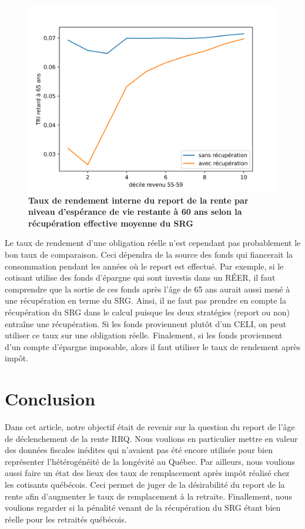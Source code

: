 \documentclass[french, 12pt]{article}
\begin{document}
	\begin{figure}[!htbp]
	\centering 
	\includegraphics[scale=0.75]{../figures/tri_claw.png}
	\caption{\textbf{Taux de rendement interne du report de la rente par niveau d'espérance de vie restante à 60 ans selon la récupération effective moyenne du SRG}}
	\label{fig:tri_claw}
	\end{figure}
	
	Le taux de rendement d'une obligation réelle n'est cependant pas probablement le bon taux de comparaison. Ceci dépendra de la source des fonds qui fiancerait la consommation pendant les années où le report est effectué. Par exemple, si le cotisant utilise des fonds d'épargne qui sont investis dans un RÉER, il faut comprendre que la sortie de ces fonds après l'âge de 65 ans aurait aussi mené à une récupération en terme du SRG. Ainsi, il ne faut pas prendre en compte la récupération du SRG dans le calcul puisque les deux stratégies (report ou non) entraîne une récupération. Si les fonds proviennent plutôt d'un CELI, on peut utiliser ce taux sur une obligation réelle. Finalement, si les fonds proviennent d'un compte d'épargne imposable, alors il faut utiliser le taux de rendement après impôt. 
	
	
	\section{Conclusion}
	
	Dans cet article, notre objectif était de revenir sur la question du report de l'âge de déclenchement de la rente RRQ. Nous voulions en particulier mettre en valeur des données fiscales inédites qui n'avaient pas été encore utilisée pour bien représenter l'hétérogénéité de la longévité au Québec. Par ailleurs, nous voulions aussi faire un état des lieux des taux de remplacement après impôt réalisé chez les cotisants québécois. Ceci permet de juger de la désirabilité du report de la rente afin d'augmenter le taux de remplacement à la retraite. Finallement, nous voulions regarder si la pénalité venant de la récupération du SRG étant bien réelle pour les retraités québécois. 
	
\end{document}
